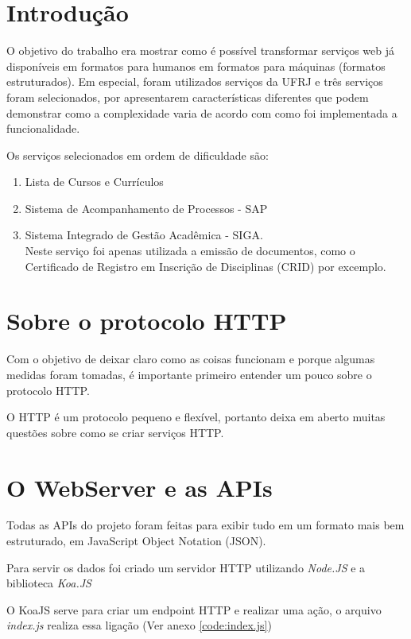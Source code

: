 \section{Introdução}

O objetivo do trabalho era mostrar como é possível transformar serviços web já disponíveis em formatos para humanos em formatos para máquinas (formatos estruturados). Em especial, foram utilizados serviços da UFRJ e três serviços foram selecionados, por apresentarem características diferentes que podem demonstrar como a complexidade varia de acordo com como foi implementada a funcionalidade.

Os serviços selecionados em ordem de dificuldade são:

\begin{enumerate}
    \item Lista de Cursos e Currículos
    \item Sistema de Acompanhamento de Processos - SAP
    \item Sistema Integrado de Gestão Acadêmica - SIGA. \\
    Neste serviço foi apenas utilizada a emissão de documentos, como o Certificado de Registro em Inscrição de Disciplinas (CRID) por excemplo.
\end{enumerate}

\section{Sobre o protocolo HTTP}

Com o objetivo de deixar claro como as coisas funcionam e porque algumas medidas foram tomadas, é importante primeiro entender um pouco sobre o protocolo HTTP.

O HTTP é um protocolo pequeno e flexível, portanto deixa em aberto muitas questões sobre como se criar serviços HTTP.

\section{O WebServer e as APIs}

Todas as APIs do projeto foram feitas para exibir tudo em um formato mais bem estruturado, em JavaScript Object Notation (JSON).

Para servir os dados foi criado um servidor HTTP utilizando \textit{Node.JS} e a biblioteca \textit{Koa.JS}

O KoaJS serve para criar um endpoint HTTP e realizar uma ação, o arquivo \textit{index.js} realiza essa ligação (Ver anexo \ref{code:index.js})

